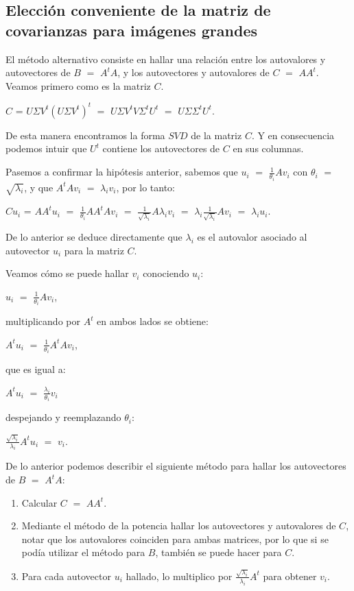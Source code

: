 \subsection{Elección conveniente de la matriz de covarianzas para imágenes grandes}

El método alternativo consiste en hallar una relación entre los autovalores y autovectores de $B$ $=$ $A^{t} A$, y los autovectores y autovalores de $C$ $=$ $A A^{t}$.
Veamos primero como es la matriz $C$.

$C$ = $U \Sigma V^t (U \Sigma V^t)^{t}$ $=$ $U \Sigma V^t V \Sigma^{t} U^{t} $ $=$ $U \Sigma \Sigma^{t} U^{t}$. 

De esta manera encontramos la forma $SVD$ de la matriz $C$. Y en consecuencia podemos intuir que $U^{t}$ contiene los autovectores de $C$ en sus columnas.

Pasemos a confirmar la hipótesis anterior, sabemos que $u_{i}$ $=$ $\frac{1}{ \theta_{i} } A v_{i}$ con $\theta_{i}$ $=$ $\sqrt{ \lambda_{i} }$, y que $A^{t} A v_{i}$ $=$ $\lambda_{i} v_{i}$, por lo tanto:

$C u_{i}$ = $A A^{t} u_{i}$ $=$ $\frac{1}{ \theta_{i} } A A^{t}  A v_{i}$ $=$ $ \frac{ 1 }{ \sqrt{ \lambda_{i} } } A  \lambda_{i} v_{i}$ $=$ $ \lambda_{i} \frac{ 1 }{ \sqrt{ \lambda_{i} } } A  v_{i}$ $=$ $\lambda_{i} u_{i}$.

De lo anterior se deduce directamente que $\lambda_{i}$ es el autovalor asociado al autovector $u_{i}$ para la matriz $C$.

Veamos cómo se puede hallar $v_{i}$ conociendo $u_{i}$:

$u_{i}$ $=$ $\frac{1}{ \theta_{i} } A v_{i}$, 

multiplicando por $A^{t}$ en ambos lados se obtiene:

$A^{t} u_{i}$ $=$ $ \frac{1}{ \theta_{i} } A^{t} A v_{i}$, 

que es igual a: 

$A^{t} u_{i}$ $=$ $\frac{\lambda_{i}}{ \theta_{i} }  v_{i}$ 

despejando y reemplazando $\theta_{i}$:

$\frac{ \sqrt{\lambda_{i} } }{ \lambda_{i} }  A^{t} u_{i}$ $=$ $v_{i}$.

De lo anterior podemos describir el siguiente método para hallar los autovectores de $B$ $=$ $A^{t} A$:
\begin{enumerate}
\item Calcular $C$ $=$ $A A^{t}$.
\item Mediante el método de la potencia hallar los autovectores y autovalores de $C$, notar que los autovalores coinciden para ambas matrices, por lo que si  se podía utilizar el método para $B$, también se puede hacer para $C$.
\item Para cada autovector $u_{i}$ hallado, lo multiplico por $\frac{ \sqrt{\lambda_{i} } }{ \lambda_{i} }  A^{t}$ para obtener $v_{i}$.
\end{enumerate}

